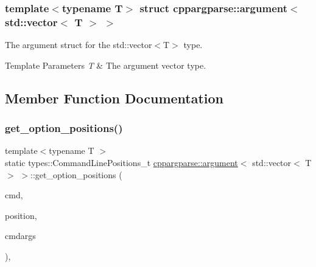 \subsubsection*{template$<$typename T$>$\newline
struct cppargparse\+::argument$<$ std\+::vector$<$ T $>$ $>$}

The argument struct for the std\+::vector$<$\+T$>$ type. 


\begin{DoxyTemplParams}{Template Parameters}
{\em T} & The argument vector type. \\
\hline
\end{DoxyTemplParams}


\subsection{Member Function Documentation}
\mbox{\label{structcppargparse_1_1argument_3_01std_1_1vector_3_01T_01_4_01_4_a57aaaece7f0d299010f47a9bbfbe5e70}} 
\subsubsection{\texorpdfstring{get\+\_\+option\+\_\+positions()}{get\_option\_positions()}}
{\footnotesize\ttfamily template$<$typename T $>$ \\
static types\+::\+Command\+Line\+Positions\+\_\+t \hyperlink{structcppargparse_1_1argument}{cppargparse\+::argument}$<$ std\+::vector$<$ T $>$ $>$\+::get\+\_\+option\+\_\+positions (\begin{DoxyParamCaption}\item[{const types\+::\+Command\+Line\+\_\+t \&}]{cmd,  }\item[{const types\+::\+Command\+Line\+Position\+\_\+t \&}]{position,  }\item[{const types\+::\+Command\+Line\+Arguments\+\_\+t \&}]{cmdargs }\end{DoxyParamCaption})\hspace{0.3cm}{\ttfamily [inline]}, {\ttfamily [static]}}



